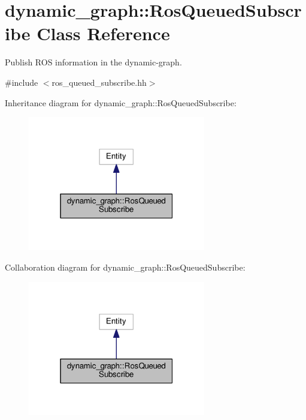 \hypertarget{classdynamic__graph_1_1RosQueuedSubscribe}{}\section{dynamic\+\_\+graph\+:\+:Ros\+Queued\+Subscribe Class Reference}
\label{classdynamic__graph_1_1RosQueuedSubscribe}


Publish R\+OS information in the dynamic-\/graph.  




{\ttfamily \#include $<$ros\+\_\+queued\+\_\+subscribe.\+hh$>$}



Inheritance diagram for dynamic\+\_\+graph\+:\+:Ros\+Queued\+Subscribe\+:
\nopagebreak
\begin{figure}[H]
\begin{center}
\leavevmode
\includegraphics[width=220pt]{classdynamic__graph_1_1RosQueuedSubscribe__inherit__graph}
\end{center}
\end{figure}


Collaboration diagram for dynamic\+\_\+graph\+:\+:Ros\+Queued\+Subscribe\+:
\nopagebreak
\begin{figure}[H]
\begin{center}
\leavevmode
\includegraphics[width=220pt]{classdynamic__graph_1_1RosQueuedSubscribe__coll__graph}
\end{center}
\end{figure}
